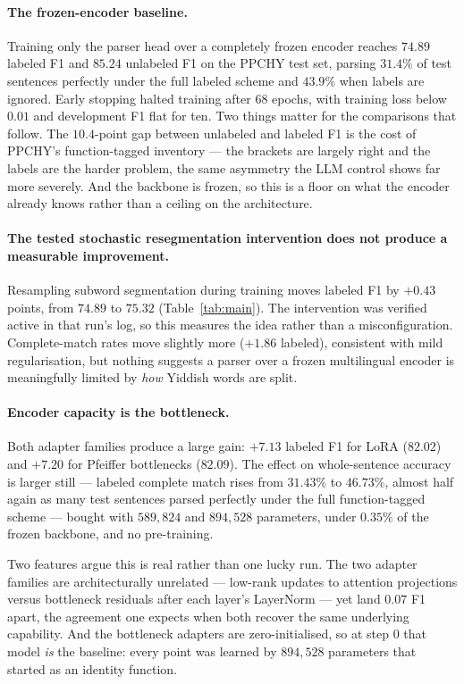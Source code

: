 \documentclass[11pt]{article}
\begin{document}
\paragraph{The frozen-encoder baseline.} Training only the parser head over a
completely frozen encoder reaches $74.89$ labeled F1 and $85.24$ unlabeled F1 on
the PPCHY test set, parsing $31.4\%$ of test sentences perfectly under the full
labeled scheme and $43.9\%$ when labels are ignored. Early stopping halted
training after $68$ epochs, with training loss below $0.01$ and development F1
flat for ten. Two things matter for the comparisons that follow. The $10.4$-point
gap between unlabeled and labeled F1 is the cost of PPCHY's function-tagged
inventory --- the brackets are largely right and the labels are the harder
problem, the same asymmetry the LLM control shows far more severely. And the
backbone is frozen, so this is a floor on what the encoder already knows rather
than a ceiling on the architecture.
\paragraph{The tested stochastic resegmentation intervention does not produce a measurable improvement.} Resampling subword
segmentation during training moves labeled F1 by $+0.43$ points, from $74.89$ to
$75.32$ (Table~\ref{tab:main}). The intervention was verified active in that run's
log, so this measures the idea rather than a misconfiguration. Complete-match rates
move slightly more ($+1.86$ labeled), consistent with mild regularisation, but
nothing suggests a parser over a frozen multilingual encoder is meaningfully
limited by \emph{how} Yiddish words are split.

\paragraph{Encoder capacity is the bottleneck.} Both adapter families produce a large gain:
$+7.13$ labeled F1 for LoRA ($82.02$) and $+7.20$ for Pfeiffer bottlenecks
($82.09$). The effect on whole-sentence accuracy is larger still --- labeled
complete match rises from $31.43\%$ to $46.73\%$, almost half again as many test
sentences parsed perfectly under the full function-tagged scheme --- bought with
$589{,}824$ and $894{,}528$ parameters, under $0.35\%$ of the frozen backbone, and
no pre-training.

Two features argue this is real rather than one lucky run. The two adapter
families are architecturally unrelated --- low-rank updates to attention
projections versus bottleneck residuals after each layer's LayerNorm --- yet land
$0.07$ F1 apart, the agreement one expects when both recover the same underlying
capability. And the bottleneck adapters are zero-initialised, so at step $0$ that
model \emph{is} the baseline: every point was learned by $894{,}528$ parameters
that started as an identity function.
\end{document}

